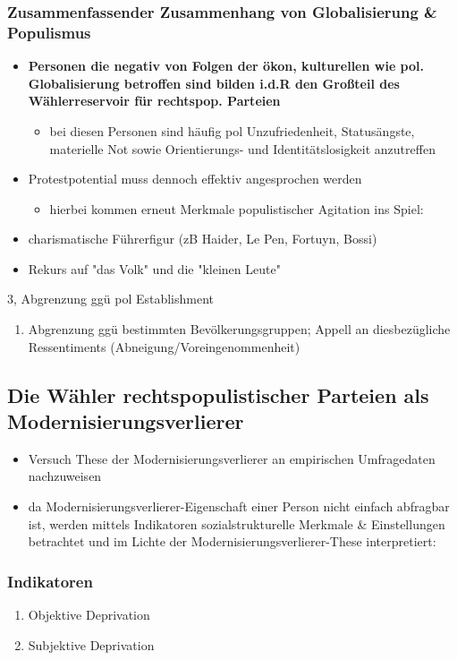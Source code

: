\documentclass[11pt]{article}
\begin{document}
\subsubsection{Zusammenfassender Zusammenhang von Globalisierung \& Populismus}
\label{sec:orgea3ca50}
\begin{itemize}
\item \textbf{Personen die negativ von Folgen der ökon, kulturellen wie pol. Globalisierung betroffen sind bilden i.d.R den Großteil des Wählerreservoir für rechtspop. Parteien}
\begin{itemize}
\item bei diesen Personen sind häufig pol Unzufriedenheit, Statusängste, materielle Not sowie Orientierungs- und Identitätslosigkeit anzutreffen
\end{itemize}
\item Protestpotential muss dennoch effektiv angesprochen werden
\begin{itemize}
\item hierbei kommen erneut Merkmale populistischer Agitation ins Spiel:
\end{itemize}
\item charismatische Führerfigur (zB Haider, Le Pen, Fortuyn, Bossi)
\item Rekurs auf "das Volk"  und die "kleinen Leute"
\end{itemize}
3, Abgrenzung ggü pol Establishment
\begin{enumerate}
\item Abgrenzung ggü bestimmten Bevölkerungsgruppen; Appell an diesbezügliche Ressentiments (Abneigung/Voreingenommenheit)
\end{enumerate}
\subsection{Die Wähler rechtspopulistischer Parteien als Modernisierungsverlierer}
\label{sec:org0ad0324}
\begin{itemize}
\item Versuch These der Modernisierungsverlierer an empirischen Umfragedaten nachzuweisen
\item da Modernisierungsverlierer-Eigenschaft einer Person nicht einfach abfragbar ist, werden mittels Indikatoren sozialstrukturelle Merkmale \& Einstellungen betrachtet und im Lichte der Modernisierungsverlierer-These interpretiert:
\end{itemize}
\subsubsection{Indikatoren}
\label{sec:org48d70f2}
\begin{enumerate}
\item Objektive Deprivation
\item Subjektive Deprivation
\end{enumerate}
\end{document}
